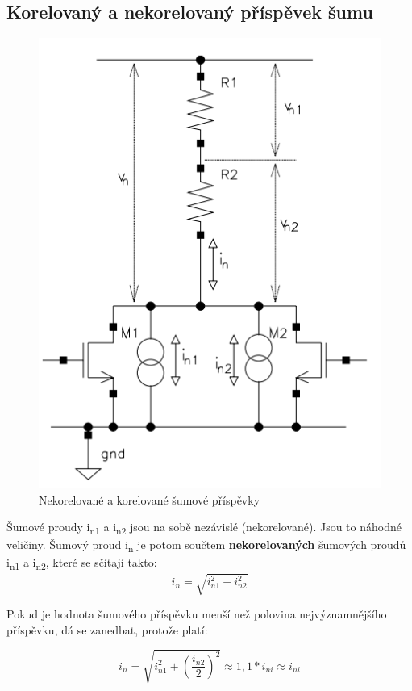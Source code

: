 \subsection{Korelovaný a nekorelovaný příspěvek šumu}
\begin{figure}[h]
   \begin{center}
     \includegraphics[scale=0.5]{images/korel.png}
   \end{center}
   \caption{Nekorelované a korelované šumové příspěvky}
\end{figure}

Šumové proudy i\textsubscript{n1} a i\textsubscript{n2} jsou na sobě nezávislé (nekorelované). Jsou to náhodné veličiny. Šumový proud i\textsubscript{n} je potom součtem \textbf{nekorelovaných} šumových proudů i\textsubscript{n1} a i\textsubscript{n2}, které se sčítají takto:
\begin{equation}
i_{n}=\sqrt{i_{n1}^2+i_{n2}^2}
\end{equation}

Pokud je hodnota šumového příspěvku menší než polovina nejvýznamnějšího příspěvku, dá se zanedbat, protože platí:

\begin{equation}
i_{n}=\sqrt{i_{n1}^2+(\frac{ i_{n2}}{2})^2} \approx 1,1 *i_{ni}\approx i_{ni}
\end{equation}

